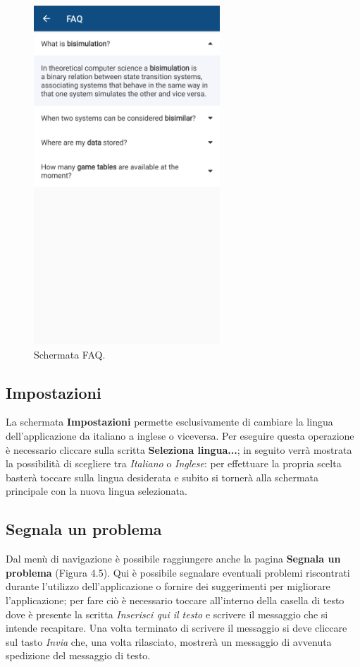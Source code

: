 \documentclass[a4paper,11pt,twoside,openright]{report}
\begin{document}
\begin{figure}[h]
\centering
\includegraphics[width=\linewidth,height=360pt,keepaspectratio]{images/FAQ.png}
\caption{Schermata FAQ.}
\end{figure}

\subsection{Impostazioni}
La schermata \textbf{Impostazioni} permette esclusivamente di cambiare la lingua dell'applicazione da italiano a inglese o viceversa. Per eseguire questa operazione è necessario 
cliccare sulla scritta \textbf{Seleziona lingua...}; in seguito verrà mostrata la possibilità di scegliere tra \textit{Italiano} o \textit{Inglese}: per effettuare la propria scelta basterà toccare
sulla lingua desiderata e subito si tornerà alla schermata principale con la nuova lingua selezionata.


\subsection{Segnala un problema}
Dal menù di navigazione è possibile raggiungere anche la pagina \textbf{Segnala un problema} (Figura 4.5). Qui è possibile segnalare eventuali problemi riscontrati durante l'utilizzo dell'applicazione
o fornire dei suggerimenti per migliorare l'applicazione; per fare ciò è necessario toccare all'interno della casella di testo dove è presente la scritta \textit{Inserisci qui il testo} e scrivere
il messaggio che si intende recapitare. Una volta terminato di scrivere il messaggio si deve cliccare sul tasto \textit{Invia} che, una volta rilasciato, mostrerà un messaggio di avvenuta spedizione del messaggio di testo.
\end{document}
